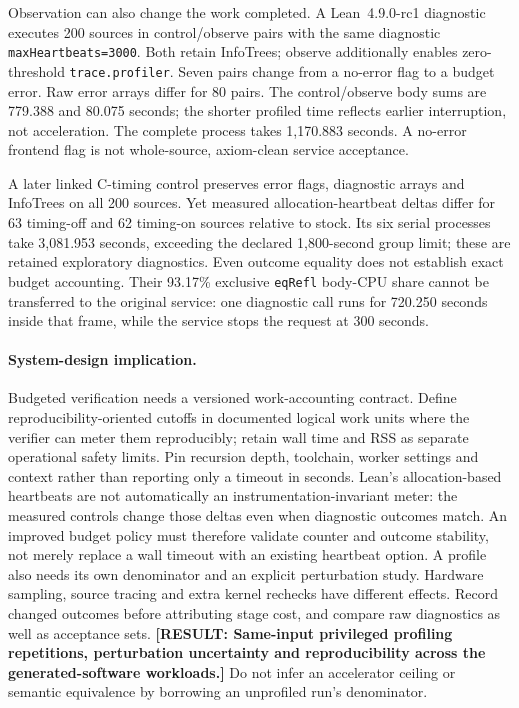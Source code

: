 \documentclass[10pt,twocolumn]{article}
\newcommand{\missing}[1]{\textbf{[RESULT: #1]}}
\begin{document}
Observation can also change the work completed.
A Lean~4.9.0-rc1 diagnostic executes 200 sources in control/observe pairs
with the same diagnostic \texttt{maxHeartbeats=3000}.
Both retain InfoTrees; observe additionally enables zero-threshold
\texttt{trace.profiler}. Seven pairs change from a no-error flag to a
budget error. Raw error arrays differ for 80 pairs.
The control/observe body sums are 779.388 and 80.075 seconds; the shorter
profiled time reflects earlier interruption, not acceleration.
The complete process takes 1,170.883 seconds.
A no-error frontend flag is not whole-source, axiom-clean service acceptance.

A later linked C-timing control preserves error flags, diagnostic arrays
and InfoTrees on all 200 sources. Yet measured allocation-heartbeat deltas
differ for 63 timing-off and 62 timing-on sources relative to stock.
Its six serial processes take 3,081.953 seconds, exceeding the declared
1,800-second group limit; these are retained exploratory diagnostics.
Even outcome equality does not establish exact budget accounting.
Their 93.17\% exclusive \texttt{eqRefl} body-CPU share cannot be transferred
to the original service: one diagnostic call runs for 720.250 seconds
inside that frame, while the service stops the request at 300 seconds.

\paragraph{System-design implication.}
Budgeted verification needs a versioned work-accounting contract.
Define reproducibility-oriented cutoffs in documented logical work units
where the verifier can meter them reproducibly; retain wall time and RSS as
separate operational safety limits. Pin recursion depth, toolchain, worker
settings and context rather than reporting only a timeout in seconds.
Lean's allocation-based heartbeats are not automatically an
instrumentation-invariant meter: the measured controls change those deltas
even when diagnostic outcomes match. An improved budget policy must
therefore validate counter and outcome stability, not merely replace a wall
timeout with an existing heartbeat option.
A profile also needs its own denominator and an explicit perturbation study.
Hardware sampling, source tracing and extra kernel rechecks have different
effects. Record changed outcomes before attributing stage cost, and compare
raw diagnostics as well as acceptance sets.
\missing{Same-input privileged profiling repetitions, perturbation
uncertainty and reproducibility across the generated-software workloads.}
Do not infer an accelerator ceiling or semantic equivalence by borrowing an
unprofiled run's denominator.
\end{document}

